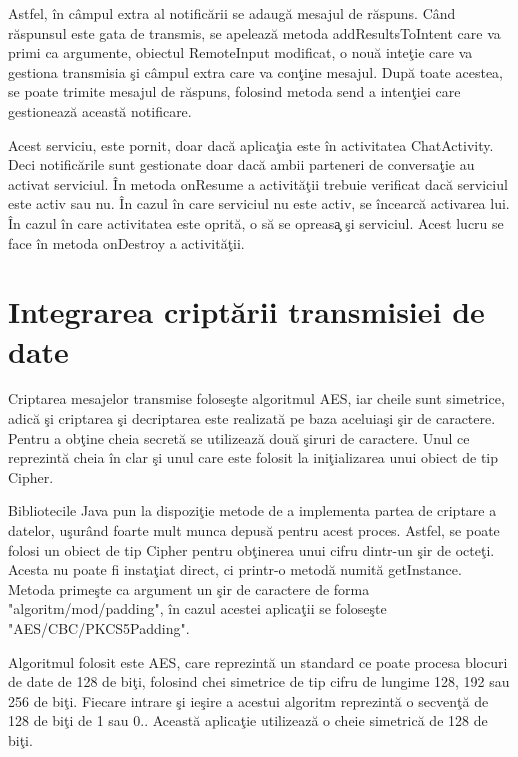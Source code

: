 Astfel, \^{i}n c\^{a}mpul extra al notific\u{a}rii se adaug\u{a} mesajul de r\u{a}spuns. C\^{a}nd r\u{a}spunsul este gata de transmis, se apeleaz\u{a} metoda addResultsToIntent care va primi ca argumente, obiectul RemoteInput modificat, o nou\u{a} inte\c{t}ie care va gestiona transmisia \c{s}i c\^{a}mpul extra care va con\c{t}ine mesajul. Dup\u{a} toate acestea, se poate trimite mesajul de r\u{a}spuns, folosind metoda send a inten\c{t}iei care gestioneaz\u{a} aceast\u{a} notificare.

Acest serviciu, este pornit, doar dac\u{a} aplica\c{t}ia este \^{i}n activitatea ChatActivity. Deci notific\u{a}rile sunt gestionate doar dac\u{a} ambii parteneri de conversa\c{t}ie au activat serviciul. \^{I}n metoda onResume a activit\u{a}\c{t}ii trebuie verificat dac\u{a} serviciul este activ sau nu. \^{I}n cazul \^{i}n care serviciul nu este activ, se \^{i}ncearc\u{a} activarea lui. \^{I}n cazul \^{i}n care activitatea este oprit\u{a}, o s\u{a} se opreas\c{a} \c{s}i serviciul. Acest lucru se face \^{i}n metoda onDestroy a activit\u{a}\c{t}ii.
 
\section{Integrarea cript\u{a}rii transmisiei de date}

Criptarea mesajelor transmise folose\c{s}te algoritmul AES, iar cheile sunt simetrice, adic\u{a} \c{s}i criptarea \c{s}i decriptarea este realizat\u{a} pe baza aceluia\c{s}i \c{s}ir de caractere. Pentru a ob\c{t}ine cheia secret\u{a} se utilizeaz\u{a} dou\u{a} \c{s}iruri de caractere. Unul ce reprezint\u{a} cheia \^{i}n clar \c{s}i unul care este folosit la ini\c{t}ializarea unui obiect de tip Cipher.

Bibliotecile Java pun la dispozi\c{t}ie metode de a implementa partea de criptare a datelor, u\c{s}ur\^{a}nd foarte mult munca depus\u{a} pentru acest proces. Astfel, se poate folosi un obiect de tip Cipher pentru ob\c{t}inerea unui cifru dintr-un \c{s}ir de octe\c{t}i. Acesta nu poate fi insta\c{t}iat direct, ci printr-o metod\u{a} numit\u{a} getInstance. Metoda prime\c{s}te ca argument un \c{s}ir de caractere de forma "algoritm/mod/padding", \^{i}n cazul acestei aplica\c{t}ii se folose\c{s}te "AES/CBC/PKCS5Padding". 

Algoritmul folosit este AES, care reprezint\u{a} un standard ce poate procesa blocuri de date de 128 de bi\c{t}i, folosind chei simetrice de tip cifru de lungime 128, 192 sau 256 de bi\c{t}i. Fiecare intrare \c{s}i ie\c{s}ire a acestui algoritm reprezint\u{a} o secven\c{t}\u{a} de 128 de bi\c{t}i de 1 sau 0.\cite{Miller:2009:AES:1823209}. Aceast\u{a} aplica\c{t}ie utilizeaz\u{a} o cheie simetric\u{a} de 128 de bi\c{t}i. 

